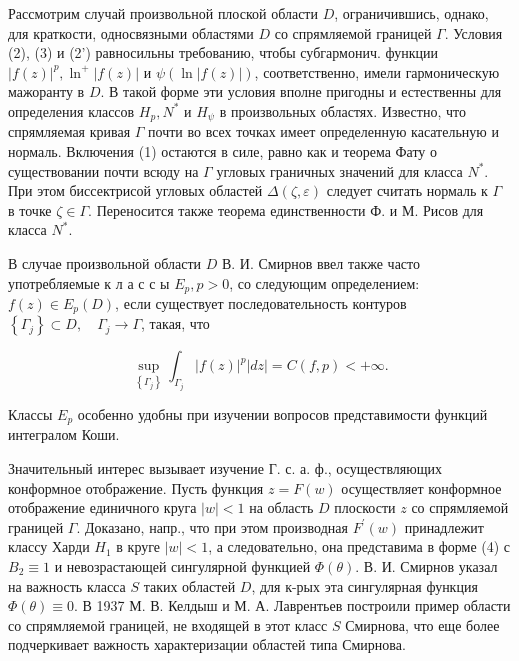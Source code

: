 \documentclass[10pt]{article}
\begin{document}
Рассмотрим случай произвольной плоской области $D$, ограничившись, однако, для краткости, односвязными областями $D$ со спрямляемой границей $\Gamma$. Условия (2), (3) и (2') равносильны требованию, чтобы субгармонич. функции $|f(z)|^{p}, \ln ^{+}|f(z)|$ и $\psi(\ln |f(z)|)$, соответственно, имели гармоническую мажоранту в $D$. В такой форме эти условия вполне пригодны и естественны для определения классов $H_{p}, N^{*}$ и $H_{\psi}$ в произвольных областях. Известно, что спрямляемая кривая $\Gamma$ почти во всех точках имеет определенную касательную и нормаль. Включения (1) остаются в силе, равно как и теорема Фату о существовании почти всюду на $\Gamma$ угловых граничных значений для класса $N^{*}$. При этом биссектрисой угловых областей $\Delta(\zeta, \varepsilon)$ следует считать нормаль к $\Gamma$ в точке $\zeta \in \Gamma$. Переносится также теорема единственности Ф. и М. Рисов для класса $N^{*}$.



В случае произвольной области $D$ В. И. Смирнов ввел также часто употребляемые к л а с с ы $E_{p}, p>0$, со следующим определением: $f(z) \in E_{p}(D)$, если существует последовательность контуров $\left\{\Gamma_{j}\right\} \subset D, \quad \Gamma_{j} \rightarrow \Gamma$, такая, что



\[

\sup _{\left\{\Gamma_{j}\right\}} \int_{\Gamma_{j}}|f(z)|^{p}|d z|=C(f, p)<+\infty .

\]



Классы $E_{p}$ особенно удобны при изучении вопросов представимости функций интегралом Коши.



Значительный интерес вызывает изучение Г. с. а. ф., осуществляющих конформное отображение. Пусть функция $z=F(w)$ осуществляет конформное отображение единичного круга $|w|<1$ на область $D$ плоскости $z$ со спрямляемой границей $\Gamma$. Доказано, напр., что при этом производная $F^{\prime}(w)$ принадлежит классу Харди $H_{1}$ в круге $|w|<1$, а следовательно, она представима в форме (4) с $B_{2} \equiv 1$ и невозрастающей сингулярной функцией $\Phi(\theta)$. В. И. Смирнов указал на важность класса $S$ таких областей $D$, для к-рых эта сингулярная функция $\Phi(\theta) \equiv 0$. В 1937 М. В. Келдыш и М. А. Лаврентьев построили пример области со спрямляемой границей, не входящей в этот класс $S$ Смирнова, что еще более подчеркивает важность характеризации областей типа Смирнова.
\end{document}
